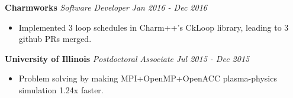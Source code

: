 



\newcommand{\myExpSix}{
\item Implemented 3 loop schedules in Charm++'s CkLoop library, leading to 3 github PRs merged. 
}
\noindent
\textbf{Charmworks}\hfill
\textit{Software Developer} \hfill \textit{Jan 2016 - Dec 2016} 
\begin{itemize}
\myExpSix

\end{itemize} 
\noindent
\textbf{University of Illinois}\hfill
\textit{Postdoctoral Associate} \hfill \textit{Jul 2015 - Dec 2015}
\begin{itemize}[itemsep=-0.1em]
\item Problem solving by making MPI+OpenMP+OpenACC plasma-physics simulation 1.24x faster.
\end{itemize}
